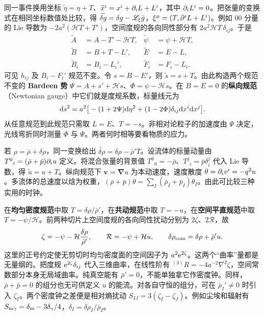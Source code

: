 同一事件换用坐标 $\widetilde\eta=\eta+T$、$\widetilde x^i=x^i+\partial_i L+L^i$，其中 $\partial_iL^i=0$。把张量的变换式在相同坐标数值处比较，得 $\widetilde{\delta g}=\delta g-\mathscr{L}_\xi\bar g$，$\xi^\mu=(T,\partial^iL+L^i)$。例如 $00$ 分量的 Lie 导数为 $-2a^2(\mathcal H T+T')$，空间度规的各向同性部分有 $2a^2\mathcal H T\,\delta_{ij}$。于是
\begin{equation}\label{eq:cl-gauge}
\begin{aligned}
 \widetilde A&=A-T'-\mathcal H T,& \widetilde \psi&=\psi+\mathcal H T,\\
 \widetilde B&=B+T-L',& \widetilde E&=E-L,\\
 \widetilde B_i&=B_i-L_i',&\widetilde F_i&=F_i-L_i .
\end{aligned}
\end{equation}
可见 $h_{ij}$ 及 $B_i-F_i'$ 规范不变。令 $s=B-E'$，则 $\widetilde s=s+T$。由此构造两个规范不变的 \textbf{Bardeen 势} $\Psi=A+s'+\mathcal H s$、$\Phi=\psi-\mathcal H s$。在 $B=E=0$ 的\textbf{纵向规范}（Newtonian gauge）中它们就是度规系数，标量线元为
\begin{equation}\label{eq:cl-newtonmetric}
 \dd s^2=a^2\big[-(1+2\Psi)\dd\eta^2+(1-2\Phi)\delta_{ij}\dd x^i\dd x^j\big].
\end{equation}
从任意规范到此规范只需取 $L=E$、$T=-s$。非相对论粒子的加速度由 $\Psi$ 决定，光线弯折同时测量 $\Phi$ 与 $\Psi$。两者何时相等要看物质的应力。

若 $\rho=\bar\rho+\delta\rho$，同一变换给出 $\widetilde{\delta\rho}=\delta\rho-\bar\rho'T$。设流体的标量动量由 $T^0{}_i=(\bar\rho+\bar p)\partial_i u$ 定义。将混合张量的背景值 $T^0{}_0=-\bar\rho$、$T^j{}_i=\bar p\delta^j_i$ 代入 Lie 导数，得 $\widetilde u=u+T$。纵向规范下 $\bm v=\bm\nabla u$ 为本动速度，速度散度 $\theta=\partial_i v^i=-q^2u$。多流体的总速度以焓为权重，$(\bar\rho+\bar p)\theta=\sum_I(\bar\rho_I+\bar p_I)\theta_I$。由此可比较三种实用的时钟。

在\textbf{均匀密度规范}中取 $T=\delta\rho/\bar\rho'$，在\textbf{共动规范}中取 $T=-u$，在\textbf{空间平直规范}中取 $T=-\psi/\mathcal H$。前两种切片上空间度规的各向同性扰动分别为 $2\zeta$、$2\mathcal R$，故
\begin{equation}\label{eq:cl-curvatures}
 \zeta=-\psi-\mathcal H\frac{\delta\rho}{\bar\rho'},\qquad
 \mathcal R=-\psi+\mathcal H u,\qquad
 \delta\rho_{\rm com}=\delta\rho+\bar\rho' u .
\end{equation}
这里的正号约定使无剪切时均匀密度面的空间因子为 $a^2\mathrm{e}^{2\zeta}$。这两个“曲率”量都是无量纲的。把度规 $\mathrm{e}^{2\zeta}\delta_{ij}$ 代入三维曲率，在线性阶有 ${}^{(3)}\!R=-4a^{-2}\nabla^2\zeta$，空间常数部分本身无局域曲率。纯真空能有 $\bar\rho'=0$，不能单独拿它作密度钟。同样，$\bar\rho+\bar p=0$ 的组分也无可供定义 $u$ 的能流。对各自守恒的组分，可在 $\bar\rho_I'\ne0$ 时引入 $\zeta_I$。两个密度钟之差便是相对熵扰动 $S_{IJ}=3(\zeta_I-\zeta_J)$。例如尘埃和辐射有 $S_{\rm m\gamma}=\delta_{\rm m}-3\delta_\gamma/4$，$\delta_I=\delta\rho_I/\bar\rho_I$。

